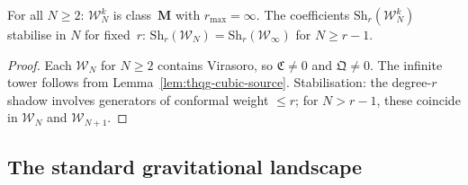 \begin{proposition}
\label{prop:thqg-wn-stabilization}
\ClaimStatusProvedHere
For all $N \geq 2$: $\mathcal{W}_N^k$ is class~$\mathbf{M}$
with $r_{\max} = \infty$. The coefficients
$\mathrm{Sh}_r(\mathcal{W}_N^k)$ stabilise in $N$ for fixed~$r$:
$\mathrm{Sh}_r(\mathcal{W}_N) = \mathrm{Sh}_r(\mathcal{W}_\infty)$
for $N \geq r - 1$.
\end{proposition}

\begin{proof}
Each $\mathcal{W}_N$ for $N \geq 2$ contains Virasoro,
so $\mathfrak{C} \neq 0$ and $\mathfrak{Q} \neq 0$.
The infinite tower follows from
Lemma~\ref{lem:thqg-cubic-source}.
Stabilisation: the degree-$r$ shadow involves generators of
conformal weight $\leq r$; for $N > r-1$, these coincide
in $\mathcal{W}_N$ and $\mathcal{W}_{N+1}$.
\end{proof}



\subsection{The standard gravitational landscape}
\label{subsec:thqg-grav-landscape}

